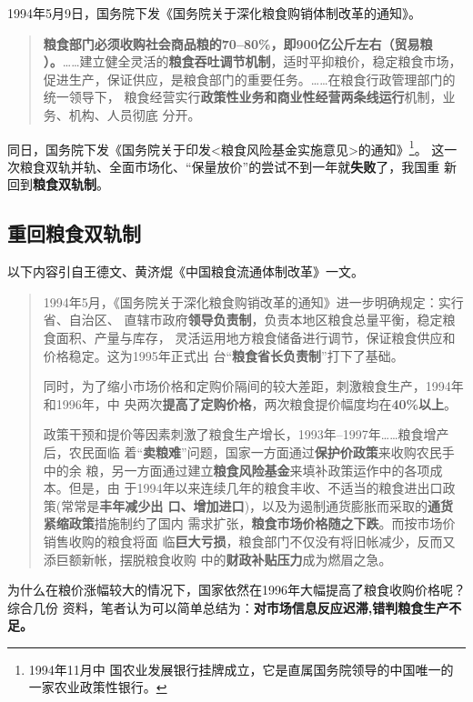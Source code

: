 1994年5月9日，国务院下发《国务院关于深化粮食购销体制改革的通知》。
\begin{quotation}
  \textbf{粮食部门必须收购社会商品粮的70--80\%，即900亿公斤左右（贸易粮
    ）。}……建立健全灵活的\textbf{粮食吞吐调节机制}，适时平抑粮价，稳定粮食市场，
  促进生产，保证供应，是粮食部门的重要任务。……在粮食行政管理部门的统一领导下，
  粮食经营实行\textbf{政策性业务和商业性经营两条线运行}机制，业务、机构、人员彻底
  分开。
\end{quotation}

同日，国务院下发《国务院关于印发<粮食风险基金实施意见>的通知》\footnote{1994年11月中
  国农业发展银行挂牌成立，它是直属国务院领导的中国唯一的一家农业政策性银行。}。
这一次粮食双轨并轨、全面市场化、“保量放价”的尝试不到一年就\textbf{失败}了，我国重
新回到\textbf{粮食双轨制}。


\subsection{重回粮食双轨制}

以下内容引自王德文、黄济焜《中国粮食流通体制改革》一文。
\begin{quotation}
  1994年5月，《国务院关于深化粮食购销改革的通知》进一步明确规定：实行省、自治区、
  直辖市政府\textbf{领导负责制}，负责本地区粮食总量平衡，稳定粮食面积、产量与库存，
  灵活运用地方粮食储备进行调节，保证粮食供应和价格稳定。这为1995年正式出
  台“\textbf{粮食省长负责制}”打下了基础。

  同时，为了缩小市场价格和定购价隔间的较大差距，刺激粮食生产，1994年和1996年，中
  央两次\textbf{提高了定购价格}，两次粮食提价幅度均在\textbf{40\%以上}。

  政策干预和提价等因素刺激了粮食生产增长，1993年--1997年……粮食增产后，农民面临
  着“\textbf{卖粮难}”问题，国家一方面通过\textbf{保护价政策}来收购农民手中的余
  粮，另一方面通过建立\textbf{粮食风险基金}来填补政策运作中的各项成本。但是，由
  于1994年以来连续几年的粮食丰收、不适当的粮食进出口政策(常常是\textbf{丰年减少出
    口、增加进口})，以及为遏制通货膨胀而采取的\textbf{通货紧缩政策}措施制约了国内
  需求扩张，\textbf{粮食市场价格随之下跌}。而按市场价销售收购的粮食将面
  临\textbf{巨大亏损}，粮食部门不仅没有将旧帐减少，反而又添巨额新帐，摆脱粮食收购
  中的\textbf{财政补贴压力}成为燃眉之急。
\end{quotation}

为什么在粮价涨幅较大的情况下，国家依然在1996年大幅提高了粮食收购价格呢？综合几份
资料，笔者认为可以简单总结为：\textbf{对市场信息反应迟滞,错判粮食生产不足。}

